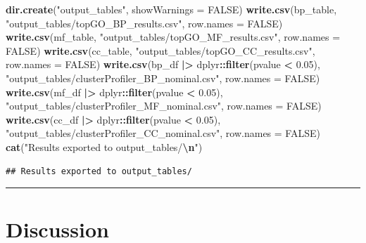 \documentclass[
  11pt,
]{article}
\newenvironment{Shaded}{\begin{snugshade}}{\end{snugshade}}
\newcommand{\AttributeTok}[1]{\textcolor[rgb]{0.13,0.29,0.53}{#1}}
\newcommand{\ConstantTok}[1]{\textcolor[rgb]{0.56,0.35,0.01}{#1}}
\newcommand{\FloatTok}[1]{\textcolor[rgb]{0.00,0.00,0.81}{#1}}
\newcommand{\FunctionTok}[1]{\textcolor[rgb]{0.13,0.29,0.53}{\textbf{#1}}}
\newcommand{\NormalTok}[1]{#1}
\newcommand{\SpecialCharTok}[1]{\textcolor[rgb]{0.81,0.36,0.00}{\textbf{#1}}}
\newcommand{\StringTok}[1]{\textcolor[rgb]{0.31,0.60,0.02}{#1}}
\begin{document}
\begin{Shaded}
\begin{Highlighting}[]
\FunctionTok{dir.create}\NormalTok{(}\StringTok{"output\_tables"}\NormalTok{, }\AttributeTok{showWarnings =} \ConstantTok{FALSE}\NormalTok{)}
\FunctionTok{write.csv}\NormalTok{(bp\_table,              }\StringTok{"output\_tables/topGO\_BP\_results.csv"}\NormalTok{, }\AttributeTok{row.names =} \ConstantTok{FALSE}\NormalTok{)}
\FunctionTok{write.csv}\NormalTok{(mf\_table,              }\StringTok{"output\_tables/topGO\_MF\_results.csv"}\NormalTok{, }\AttributeTok{row.names =} \ConstantTok{FALSE}\NormalTok{)}
\FunctionTok{write.csv}\NormalTok{(cc\_table,              }\StringTok{"output\_tables/topGO\_CC\_results.csv"}\NormalTok{, }\AttributeTok{row.names =} \ConstantTok{FALSE}\NormalTok{)}
\FunctionTok{write.csv}\NormalTok{(bp\_df }\SpecialCharTok{|\textgreater{}}\NormalTok{ dplyr}\SpecialCharTok{::}\FunctionTok{filter}\NormalTok{(pvalue }\SpecialCharTok{\textless{}} \FloatTok{0.05}\NormalTok{), }\StringTok{"output\_tables/clusterProfiler\_BP\_nominal.csv"}\NormalTok{, }\AttributeTok{row.names =} \ConstantTok{FALSE}\NormalTok{)}
\FunctionTok{write.csv}\NormalTok{(mf\_df }\SpecialCharTok{|\textgreater{}}\NormalTok{ dplyr}\SpecialCharTok{::}\FunctionTok{filter}\NormalTok{(pvalue }\SpecialCharTok{\textless{}} \FloatTok{0.05}\NormalTok{), }\StringTok{"output\_tables/clusterProfiler\_MF\_nominal.csv"}\NormalTok{, }\AttributeTok{row.names =} \ConstantTok{FALSE}\NormalTok{)}
\FunctionTok{write.csv}\NormalTok{(cc\_df }\SpecialCharTok{|\textgreater{}}\NormalTok{ dplyr}\SpecialCharTok{::}\FunctionTok{filter}\NormalTok{(pvalue }\SpecialCharTok{\textless{}} \FloatTok{0.05}\NormalTok{), }\StringTok{"output\_tables/clusterProfiler\_CC\_nominal.csv"}\NormalTok{, }\AttributeTok{row.names =} \ConstantTok{FALSE}\NormalTok{)}
\FunctionTok{cat}\NormalTok{(}\StringTok{"Results exported to output\_tables/}\SpecialCharTok{\textbackslash{}n}\StringTok{"}\NormalTok{)}
\end{Highlighting}
\end{Shaded}

\begin{verbatim}
## Results exported to output_tables/
\end{verbatim}

\begin{center}\rule{0.5\linewidth}{0.5pt}\end{center}

\section{Discussion}\label{discussion}
\end{document}
